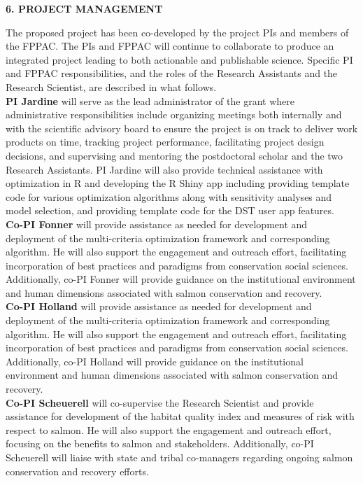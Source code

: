 \begin{center} \textbf{6. PROJECT MANAGEMENT} \end{center}

The proposed project has been co-developed by the project PIs and members of the FPPAC. The PIs and FPPAC will continue to collaborate to produce an integrated project leading to both actionable and publishable science. Specific PI and FPPAC responsibilities, and the roles of the Research Assistants and the Research Scientist, are described in what follows.\\

\textbf{PI Jardine} will serve as the lead administrator of the grant where administrative responsibilities include organizing meetings both internally and with the scientific advisory board to ensure the project is on track to deliver work products on time, tracking project performance, facilitating project design decisions, and supervising and mentoring the postdoctoral scholar and the two Research Assistants.  PI Jardine will also provide technical assistance with optimization in R and developing the R Shiny app including providing template code for various optimization algorithms along with sensitivity analyses and model selection, and providing template code for the DST user app features.\\

\textbf{Co-PI Fonner} will provide assistance as needed for development and deployment of the multi-criteria optimization framework and corresponding algorithm. He will also support the engagement and outreach effort, facilitating incorporation of best practices and paradigms from conservation social sciences. Additionally, co-PI Fonner will provide guidance on the institutional environment and human dimensions associated with salmon conservation and recovery.\\

\textbf{Co-PI Holland} will provide assistance as needed for development and deployment of the multi-criteria optimization framework and corresponding algorithm. He will also support the engagement and outreach effort, facilitating incorporation of best practices and paradigms from conservation social sciences. Additionally, co-PI Holland will provide guidance on the institutional environment and human dimensions associated with salmon conservation and recovery.\\

\textbf{Co-PI Scheuerell} will co-supervise the Research Scientist and provide assistance for development of the habitat quality index and measures of risk with respect to salmon. He will also support the engagement and outreach effort, focusing on the benefits to salmon and stakeholders. Additionally, co-PI Scheuerell will liaise with state and tribal co-managers regarding ongoing salmon conservation and recovery efforts.\\

